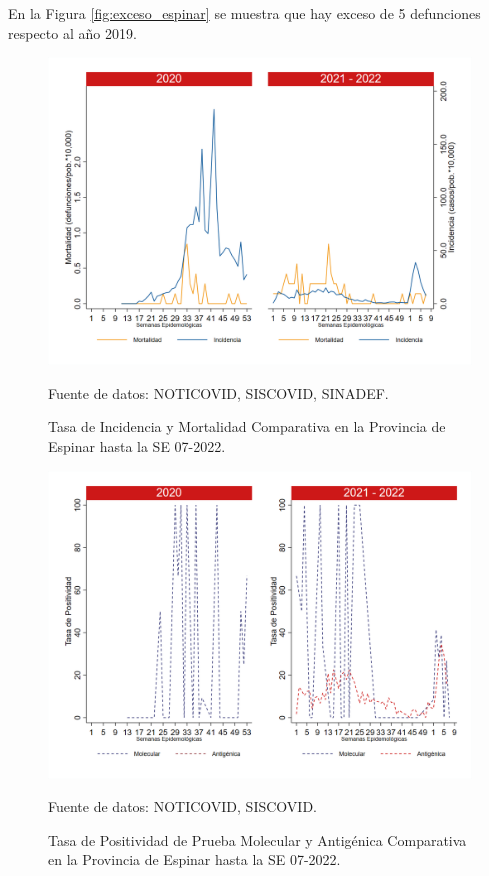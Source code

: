 \documentclass[12pt,a4paper,openany]{book}
\begin{document}
		En la Figura \ref{fig:exceso_espinar} se muestra que hay exceso de 5 defunciones respecto al año 2019.
		
		\begin{figure}[h]
			\caption{Tasa de Incidencia y Mortalidad Comparativa en la Provincia de Espinar hasta la SE 07-2022.}\label{fig:inc_mort_espinar}
			\begin{center}
				\includegraphics[width=0.85\linewidth]{../figuras/incidencia_mortalidad_20_21_8.png}
			\end{center}
			{\footnotesize {Fuente de datos: NOTICOVID, SISCOVID, SINADEF.}}
		\end{figure}
		
		\begin{figure}[h]
			\caption{Tasa de Positividad de Prueba Molecular y Antigénica Comparativa en la Provincia de Espinar hasta la SE 07-2022.}\label{fig:positividad_espinar}
			\begin{center}
				\includegraphics[width=0.7\linewidth]{../figuras/positividad_20_21_8.png}
			\end{center}
			{\footnotesize {Fuente de datos: NOTICOVID, SISCOVID.}}
		\end{figure}
		
\end{document}
